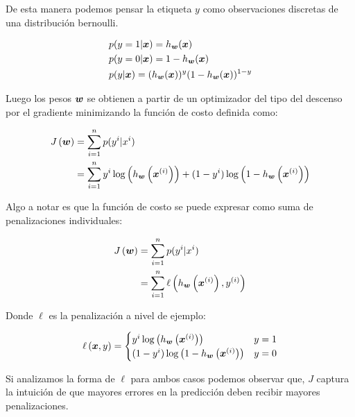 De esta manera podemos pensar la etiqueta $y$ como observaciones discretas de una
distribución bernoulli.

\begin{align}
    & p(y = 1 | \boldsymbol{x}) = h_{\boldsymbol{w}}(\boldsymbol{x}) \\
    & p(y = 0 | \boldsymbol{x}) = 1 - h_{\boldsymbol{w}}(\boldsymbol{x}) \\
    & p(y | \boldsymbol{x}) = (h_{\boldsymbol{w}}(\boldsymbol{x}))^{y}(1 - h_{\boldsymbol{w}}(\boldsymbol{x}))^{1 - y}
\end{align}

Luego los pesos $\boldsymbol{w}$ se obtienen a partir de un optimizador del tipo del
descenso por el gradiente minimizando la función de costo definida como:

\begin{align}
    J\left( \boldsymbol{w} \right) &= \sum_{i=1}^{n} p(y^{i} | x^{i}) \\
                             &= \sum_{i=1}^{n}
                                    y^{i}\log\left( h_{\boldsymbol{w}}\left( \boldsymbol{x}^{(i)} \right) \right) +
                                    (1 - y^{i})\log\left(1 - h_{\boldsymbol{w}}\left( \boldsymbol{x}^{(i)} \right) \right)
\end{align}

Algo a notar es que la función de costo se puede expresar como suma de penalizaciones
individuales:

\begin{align}
    J\left( \boldsymbol{w} \right) &= \sum_{i=1}^{n} p(y^{i} | x^{i}) \\
                             &= \sum_{i=1}^{n} \ell\left( h_{\boldsymbol{w}}\left( \boldsymbol{x}^{(i)}\right), y^{(i)}\right)
\end{align}

Donde $\ell$ es la penalización a nivel de ejemplo:

\begin{align}
    \ell\left( \boldsymbol{x}, y \right) =
    \begin{cases}
        y^{i}\log\left( h_{\boldsymbol{w}}\left( \boldsymbol{x}^{(i)} \right) \right) & y = 1 \\
        (1 - y^{i})\log\left(1 - h_{\boldsymbol{w}}\left( \boldsymbol{x}^{(i)} \right) \right) & y = 0
    \end{cases}
\end{align}

Si analizamos la forma de $\ell$ para ambos casos podemos observar que, $J$
captura la intuición de que mayores errores en la predicción deben recibir
mayores penalizaciones.

